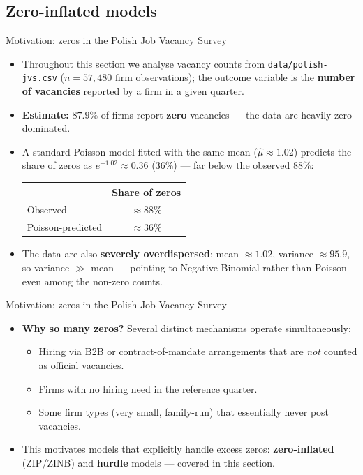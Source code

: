 \documentclass[10pt,ignorenonframetext,aspectratio=169]{beamer}
\begin{document}
\subsection{Zero-inflated models}

\begin{frame}{Motivation: zeros in the Polish Job Vacancy Survey}
\small
\begin{itemize}
\justifying
    \item Throughout this section we analyse vacancy counts from \texttt{data/polish-jvs.csv}
          ($n = 57{,}480$ firm observations); the outcome variable is the \textbf{number of
          vacancies} reported by a firm in a given quarter.
    \item \textbf{Estimate:} $87.9\%$ of firms report \textbf{zero} vacancies --- the data
          are heavily zero-dominated.
    \item A standard Poisson model fitted with the same mean ($\hat{\mu} \approx 1.02$) predicts
          the share of zeros as $e^{-1.02} \approx 0.36$ (36\%) --- far below the observed 88\%:
          \begin{center}
          \begin{tabular}{lc}
          \hline
          & Share of zeros \\
          \hline
          Observed                & $\approx 88\%$ \\
          Poisson-predicted       & $\approx 36\%$ \\
          \hline
          \end{tabular}
          \end{center}
    \item The data are also \textbf{severely overdispersed}: mean $\approx 1.02$, variance
          $\approx 95.9$, so variance $\gg$ mean --- pointing to Negative Binomial rather than
          Poisson even among the non-zero counts.
\end{itemize}
\end{frame}

\begin{frame}{Motivation: zeros in the Polish Job Vacancy Survey}
\begin{itemize}
\justifying
    \item \textbf{Why so many zeros?} Several distinct mechanisms operate simultaneously:
          \begin{itemize}
              \item Hiring via B2B or contract-of-mandate arrangements that are \textit{not}
                    counted as official vacancies.
              \item Firms with no hiring need in the reference quarter.
              \item Some firm types (very small, family-run) that essentially never post vacancies.
          \end{itemize}
    \item This motivates models that explicitly handle excess zeros:
          \textbf{zero-inflated} (ZIP/ZINB) and \textbf{hurdle} models --- covered in this section.
\end{itemize}
\end{frame}
\end{document}
